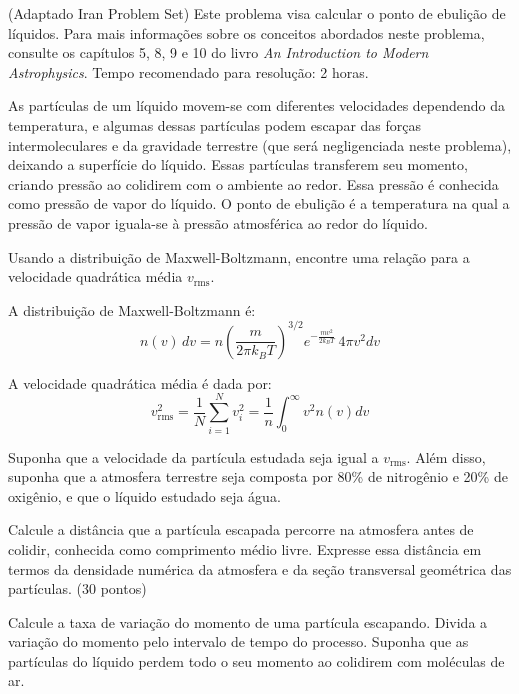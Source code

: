 \documentclass[11pt]{article}
\begin{document}
\begin{pproblem} (Adaptado Iran Problem Set)
    Este problema visa calcular o ponto de ebulição de líquidos. Para mais informações sobre os conceitos abordados neste problema, consulte os capítulos 5, 8, 9 e 10 do livro \textit{An Introduction to Modern Astrophysics}. Tempo recomendado para resolução: 2 horas.

As partículas de um líquido movem-se com diferentes velocidades dependendo da temperatura, e algumas dessas partículas podem escapar das forças intermoleculares e da gravidade terrestre (que será negligenciada neste problema), deixando a superfície do líquido. Essas partículas transferem seu momento, criando pressão ao colidirem com o ambiente ao redor. Essa pressão é conhecida como pressão de vapor do líquido. O ponto de ebulição é a temperatura na qual a pressão de vapor iguala-se à pressão atmosférica ao redor do líquido.

\begin{alternativas}
\item Usando a distribuição de Maxwell-Boltzmann, encontre uma relação para a velocidade quadrática média $v_{\text{rms}}$.

A distribuição de Maxwell-Boltzmann é:
\begin{equation}
    n(v) \, dv = n \left(\frac{m}{2\pi k_B T}\right)^{3/2} e^{-\frac{mv^2}{2k_BT}} \, 4\pi v^2 dv
\end{equation}

A velocidade quadrática média é dada por:
\begin{equation}
    v_{\text{rms}}^2 = \frac{1}{N} \sum_{i=1}^N v_i^2 = \frac{1}{n} \int_0^\infty v^2 n(v) dv
\end{equation}

\item Suponha que a velocidade da partícula estudada seja igual a $v_{\text{rms}}$. Além disso, suponha que a atmosfera terrestre seja composta por 80\% de nitrogênio e 20\% de oxigênio, e que o líquido estudado seja água.

Calcule a distância que a partícula escapada percorre na atmosfera antes de colidir, conhecida como comprimento médio livre. Expresse essa distância em termos da densidade numérica da atmosfera e da seção transversal geométrica das partículas. (30 pontos)

\item Calcule a taxa de variação do momento de uma partícula escapando. Divida a variação do momento pelo intervalo de tempo do processo. Suponha que as partículas do líquido perdem todo o seu momento ao colidirem com moléculas de ar.


\end{alternativas}
\end{pproblem}
\end{document}
